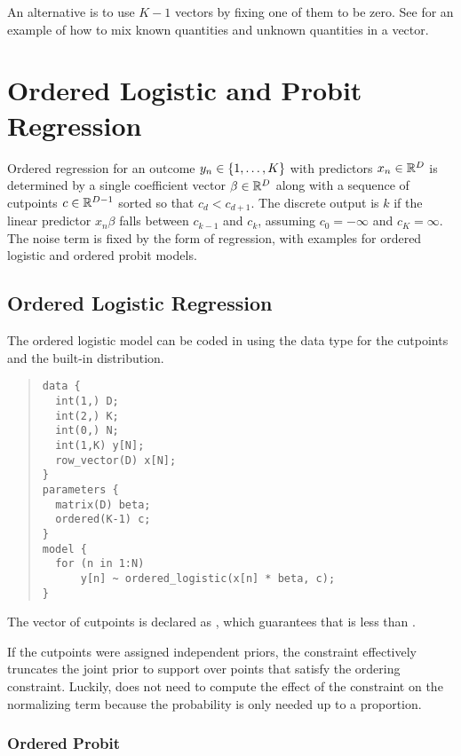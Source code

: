 An alternative is to use $K-1$ vectors by fixing one of them to be
zero.  See  for an example of
how to mix known quantities and unknown quantities in a vector.


\section{Ordered Logistic and Probit Regression}\label{ordered-logistic.section}

Ordered regression for an outcome $y_n \in \{ 1,\ldots,K \}$ with
predictors $x_n \in \mathbb{R}^D$ is determined by a single coefficient
vector $\beta \in \mathbb{R}^D$ along with a sequence of cutpoints $c \in
\mathbb{R}^{D-1}$ sorted so that $c_d < c_{d+1}$.  The discrete output is
$k$ if the linear predictor $x_n \beta$ falls between $c_{k-1}$ and
$c_k$, assuming $c_0 = -\infty$ and $c_K = \infty$.  The noise term is
fixed by the form of regression, with examples for ordered logistic
and ordered probit models.  

\subsection{Ordered Logistic Regression}

The ordered logistic model can be coded in \Stan using the
 data type for the cutpoints and the built-in
 distribution.
%
\begin{quote}
\begin{Verbatim} 
data {
  int(1,) D;
  int(2,) K;
  int(0,) N;
  int(1,K) y[N];
  row_vector(D) x[N];
} 
parameters {
  matrix(D) beta;
  ordered(K-1) c;
} 
model {
  for (n in 1:N)
      y[n] ~ ordered_logistic(x[n] * beta, c);
}
\end{Verbatim}
\end{quote}
% 
The vector of cutpoints  is declared as ,
which guarantees that  is less than . 

If the cutpoints were assigned independent priors, the constraint
effectively truncates the joint prior to support over points that
satisfy the ordering constraint.  Luckily, \Stan does not need to
compute the effect of the constraint on the normalizing term because
the probability is only needed up to a proportion.


\subsubsection{Ordered Probit}

